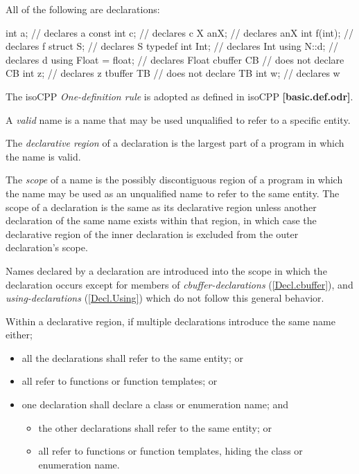\p All of the following are declarations:
\begin{HLSL}
int a;                       // declares a
const int c;                 // declares c
X anX;                       // declares anX
int f(int);                  // declares f
struct S;                    // declares S
typedef int Int;             // declares Int
using N::d;                  // declares d
using Float = float;         // declares Float
cbuffer CB {                 // does not declare CB
  int z;                     // declares z
}
tbuffer TB {                 // does not declare TB
  int w;                     // declares w
}
\end{HLSL}


\p The \gls{isoCPP} \textit{One-definition rule} is adopted as defined in
\gls{isoCPP} \textbf{[basic.def.odr]}.


\p A \textit{valid} name is a name that may be used unqualified to refer to a
specific entity.

\p The \textit{declarative region} of a declaration is the largest part of a
program in which the name is valid.

\p The \textit{scope} of a name is the possibly discontiguous region of a
program in which the name may be used as an unqualified name to refer to the
same entity. The scope of a declaration is the same as its declarative region
unless another declaration of the same name exists within that region, in which
case the declarative region of the inner declaration is excluded from the outer
declaration's scope.

\p Names declared by a declaration are introduced into the scope in which the
declaration occurs except for members of \textit{cbuffer-declarations}
(\ref{Decl.cbuffer}), and \textit{using-declarations} (\ref{Decl.Using}) which
do not follow this general behavior.

\p Within a declarative region, if multiple declarations introduce the same name
either;

\begin{itemize}
\item all the declarations shall refer to the same entity; or
\item all refer to functions or function templates; or
\item one declaration shall declare a class or enumeration name; and
\begin{itemize}
  \item the other declarations shall refer to the same entity; or
  \item all refer to functions or function templates, hiding the class or
  enumeration name.
\end{itemize}
\end{itemize}

